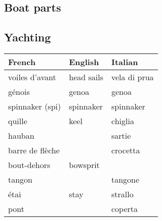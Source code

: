 \documentclass[a4paper, 12pt, twoside]{article}
\begin{document}
\begin{indt}{\section{Boat parts}}
        \begin{indt}{\subsection{Yachting}} %
            \begin{tabular}{|l|l|l|}
                \hline %
                \textbf{French}
                & \textbf{English}
                & \textbf{Italian}
                \\
                \hline
                \hline %
                voiles d'avant %
                & head sails
                & vela di prua
                \\
                \hline %
                génois %
                & genoa
                & genoa
                \\
                \hline %
                spinnaker (spi) %
                & spinnaker
                & spinnaker
                \\
                \hline %
                quille %
                & keel
                & chiglia
                \\
                \hline %
                hauban %
                &
                & sartie
                \\
                \hline %
                barre de flèche %
                &
                & crocetta
                \\
                \hline %
                bout-dehors %
                & bowsprit
                &
                \\
                \hline %
                tangon %
                &
                & tangone
                \\
                \hline %
                étai %
                & stay
                & strallo
                \\
                \hline %
                pont %
                &
                & coperta
                \\
                \hline %
            \end{tabular}
        \end{indt} %
    \end{indt} %
\end{document}
